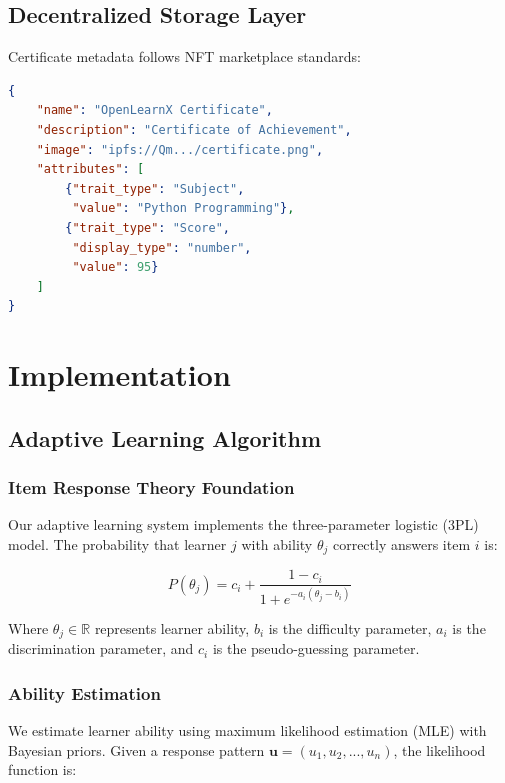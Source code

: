 \documentclass[conference]{IEEEtran}
\begin{document}
\subsection{Decentralized Storage Layer}

Certificate metadata follows NFT marketplace standards:

\begin{lstlisting}[language=json]
{
    "name": "OpenLearnX Certificate",
    "description": "Certificate of Achievement",
    "image": "ipfs://Qm.../certificate.png",
    "attributes": [
        {"trait_type": "Subject", 
         "value": "Python Programming"},
        {"trait_type": "Score", 
         "display_type": "number", 
         "value": 95}
    ]
}
\end{lstlisting}

\section{Implementation}

\subsection{Adaptive Learning Algorithm}

\subsubsection{Item Response Theory Foundation}

Our adaptive learning system implements the three-parameter logistic (3PL) model. The probability that learner $j$ with ability $\theta_j$ correctly answers item $i$ is:

\begin{equation}
P(\theta_j) = c_i + \frac{1 - c_i}{1 + e^{-a_i(\theta_j - b_i)}}
\end{equation}

Where $\theta_j \in \mathbb{R}$ represents learner ability, $b_i$ is the difficulty parameter, $a_i$ is the discrimination parameter, and $c_i$ is the pseudo-guessing parameter.

\subsubsection{Ability Estimation}

We estimate learner ability using maximum likelihood estimation (MLE) with Bayesian priors. Given a response pattern $\mathbf{u} = (u_1, u_2, ..., u_n)$, the likelihood function is:
\end{document}
